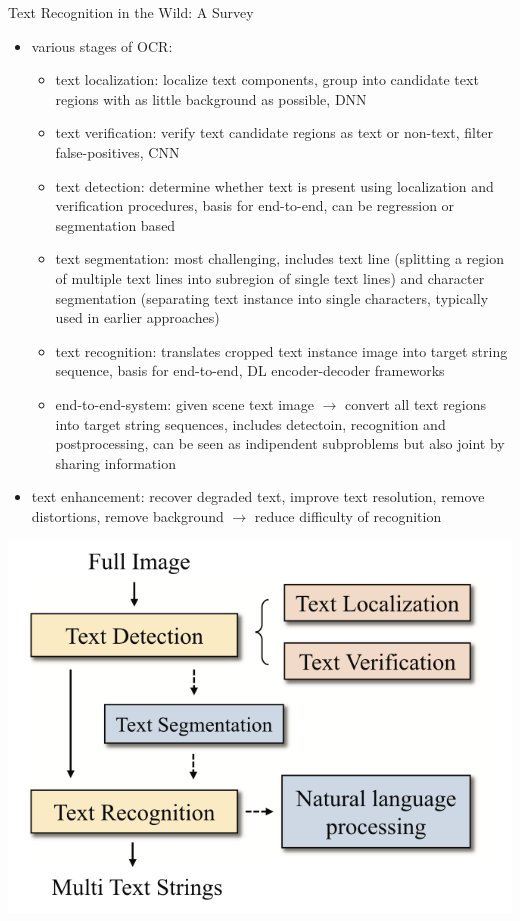 Text Recognition in the Wild: A Survey~\citep{chen_text_2021}
\begin{itemize}
    \item various stages of \ac{OCR}:
        \begin{itemize}
            \item text localization: localize text components, group into candidate text regions with
                as little background as possible, DNN
            \item text verification: verify text candidate regions as text or non-text,
                filter false-positives, CNN
            \item text detection: determine whether text is present using localization and verification
                procedures, basis for end-to-end, can be regression or segmentation based
            \item text segmentation: most challenging, includes text line (splitting a region of multiple
                text lines into subregion of single text lines) and character segmentation (separating
                text instance into single characters, typically used in earlier approaches)
            \item text recognition: translates cropped text instance image into target string sequence,
                basis for end-to-end, DL encoder-decoder frameworks
            \item end-to-end-system: given scene text image $\rightarrow$ convert all text regions into
                target string sequences, includes detectoin, recognition and postprocessing, can be
                seen as indipendent subproblems but also joint by sharing information
        \end{itemize}
    \item text enhancement: recover degraded text, improve text resolution, remove distortions,
        remove background $\rightarrow$ reduce difficulty of recognition
\end{itemize}

\includegraphics[width=\textwidth]{img/OCR-Pipeline.png}

